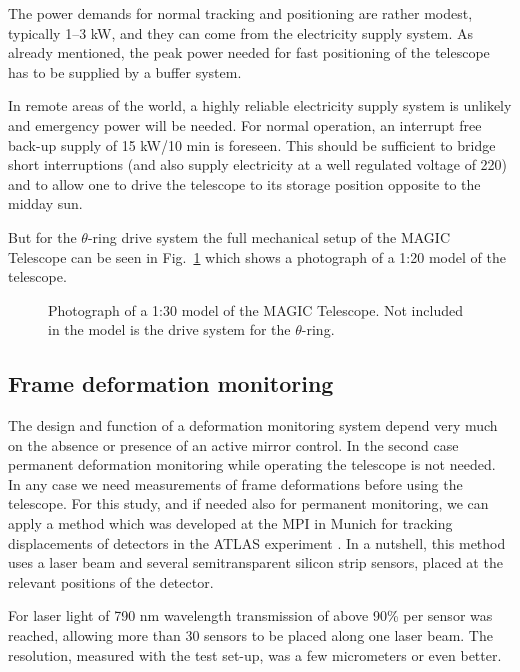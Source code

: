 The power demands for normal tracking and positioning are rather modest,
typically 1--3 kW, and they can come from the electricity supply system. As
already mentioned, the peak power needed for fast positioning of the
telescope has to be supplied by a buffer system.

In remote areas of the world, a highly reliable electricity supply system is
unlikely and emergency power will be needed. For normal operation, an
interrupt free back-up supply of 15 kW/10 min is foreseen. This should be
sufficient to bridge short interruptions (and also supply electricity at a
well regulated voltage of 220) and to allow one to drive the telescope to
its storage position opposite to the midday sun.

But for the $\theta$-ring drive system the full mechanical setup of the MAGIC
Telescope can be seen in Fig.~\ref{fig-model}
which shows a photograph
of a 1:20 model of the telescope.
\begin{figure}[htb]
\leavevmode
\centering
\epsfxsize=12cm
\caption{Photograph of a 1:30 model of the MAGIC Telescope.
Not included in the model is the drive system for the
$\theta$-ring.} 
\label{fig-model}
\end{figure}

\subsection{Frame deformation monitoring}


\medskip The design and function of a deformation monitoring system depend
very much on the absence or presence of an active mirror control. In the
second case permanent deformation monitoring while operating the telescope
is not needed. In any case we need measurements of frame deformations before
using the telescope. For this study, and if needed also for permanent
monitoring, we can apply a method which was developed at the MPI in Munich
for tracking displacements of detectors in the ATLAS experiment \cite{blum:96}. In a nutshell,
this method uses a laser beam and several semitransparent silicon strip
sensors, placed at the relevant positions of the detector.

For laser light of 790 nm wavelength transmission of above 90\% per sensor was
reached, allowing more than 30 sensors to be placed along one laser beam.
The resolution, measured with the test set-up, was a few micrometers or even
better.

